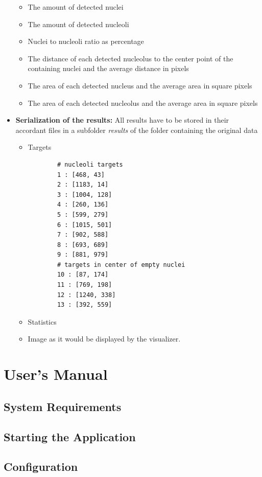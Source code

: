 \documentclass[a4paper, 11pt]{article}
\begin{document}
\begin{itemize}
\begin{itemize}
    \item The amount of detected nuclei
    \item The amount of detected nucleoli
    \item Nuclei to nucleoli ratio as percentage
    \item The distance of each detected nucleolus to the center point of the
    containing nuclei and the average distance in pixels
    \item The area of each detected nucleus and the average area in square
    pixels
    \item The area of each detected nucleolus and the average area in square
    pixels
  \end{itemize}
  \item \textbf{Serialization of the results:} All results have to be stored in
  their accordant files in a subfolder \textit{results} of the folder
  containing the original data
  \begin{itemize}
  	\item Targets 
  	\begin{lstlisting}
  		# nucleoli targets
		1 : [468, 43]
		2 : [1183, 14]
		3 : [1004, 128]
		4 : [260, 136]
		5 : [599, 279]
		6 : [1015, 501]
		7 : [902, 588]
		8 : [693, 689]
		9 : [881, 979]
		# targets in center of empty nuclei
		10 : [87, 174]
		11 : [769, 198]
		12 : [1240, 338]
		13 : [392, 559]
  	\end{lstlisting}
  	\item Statistics
  	\item Image as it would be displayed by the visualizer.
  \end{itemize}
\end{itemize}

\newpage
\section{User's Manual}

\subsection{System Requirements}

\subsection{Starting the Application}

\subsection{Configuration}
\end{document}
